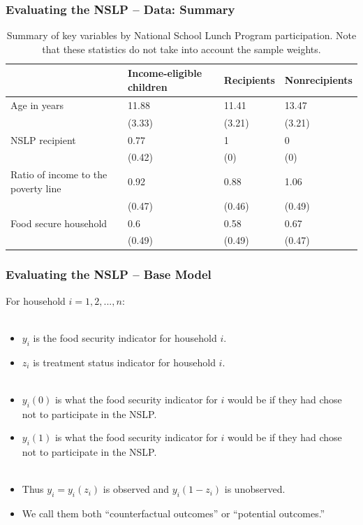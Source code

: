 \documentclass[xcolor=dvipsnames]{beamer}
\begin{document}
\begin{frame}[fragile]
  \frametitle{Evaluating the NSLP -- Data: Summary}
  
\begin{table}[!ht]
\centering
{\scriptsize
\begin{tabular}{llll}
  \hline
  & Income-eligible children & Recipients & Nonrecipients \\ 
  \hline
Age in years & 11.88 & 11.41 & 13.47 \\ 
   & (3.33) & (3.21) & (3.21) \\ 
  NSLP recipient & 0.77 & 1 & 0 \\ 
   & (0.42) & (0) & (0) \\ 
  Ratio of income to the poverty line & 0.92 & 0.88 & 1.06 \\ 
   & (0.47) & (0.46) & (0.49) \\ 
  Food secure household & 0.6 & 0.58 & 0.67 \\ 
   & (0.49) & (0.49) & (0.47) \\ 
   \hline
\end{tabular}
}
\caption{Summary of key variables by National School Lunch Program participation. Note that these statistics do not take into account the sample weights.} 
\label{dattab}
\end{table}



\end{frame}

\begin{frame}
  \frametitle{Evaluating the NSLP -- Base Model}
  For household $i=1,2,...,n$:\\~\\
\begin{itemize}
  \item $y_i$ is the food security indicator for household $i$. 
  \item $z_i$ is treatment status indicator for household $i$.\pause\\~
  \item $y_i(0)$ is what the food security indicator for $i$ would be if they had chose not to participate in the NSLP.
  \item $y_i(1)$ is what the food security indicator for $i$ would be if they had chose not to participate in the NSLP.\pause\\~
  \item Thus $y_i = y_i(z_i)$ is observed and $y_i(1-z_i)$ is unobserved. 
  \item We call them both ``counterfactual outcomes'' or ``potential outcomes.''
\end{itemize}
\end{frame}
\end{document}
